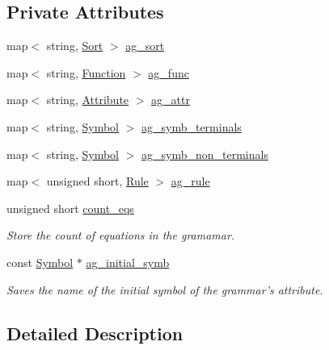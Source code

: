 \subsection*{Private Attributes}
\begin{DoxyCompactItemize}
\item 
map$<$ string, \hyperlink{classgenevalmag_1_1Sort}{Sort} $>$ \hyperlink{classgenevalmag_1_1Attr__grammar_a799dddeffb394e06770b8143b46cbc87}{ag\_\-sort}
\item 
map$<$ string, \hyperlink{classgenevalmag_1_1Function}{Function} $>$ \hyperlink{classgenevalmag_1_1Attr__grammar_a3ebc66b5f02a2c6806a6002dd09fc34f}{ag\_\-func}
\item 
map$<$ string, \hyperlink{classgenevalmag_1_1Attribute}{Attribute} $>$ \hyperlink{classgenevalmag_1_1Attr__grammar_af8eda41983da416b71568b230495cac3}{ag\_\-attr}
\item 
map$<$ string, \hyperlink{classgenevalmag_1_1Symbol}{Symbol} $>$ \hyperlink{classgenevalmag_1_1Attr__grammar_aae56008f83f809143d7f157a7281831d}{ag\_\-symb\_\-terminals}
\item 
map$<$ string, \hyperlink{classgenevalmag_1_1Symbol}{Symbol} $>$ \hyperlink{classgenevalmag_1_1Attr__grammar_a82631f05839109d0569a1554a35fa906}{ag\_\-symb\_\-non\_\-terminals}
\item 
map$<$ unsigned short, \hyperlink{classgenevalmag_1_1Rule}{Rule} $>$ \hyperlink{classgenevalmag_1_1Attr__grammar_a962f40d15bf80b0e10b27126bd149a93}{ag\_\-rule}
\item 
unsigned short \hyperlink{classgenevalmag_1_1Attr__grammar_a127f4869156cd76ee3381b19d8c7cc9a}{count\_\-eqs}
\begin{DoxyCompactList}\small\item\em Store the count of equations in the gramamar. \item\end{DoxyCompactList}\item 
const \hyperlink{classgenevalmag_1_1Symbol}{Symbol} $\ast$ \hyperlink{classgenevalmag_1_1Attr__grammar_abdcc6aa17756d47b0e6e131b26050b42}{ag\_\-initial\_\-symb}
\begin{DoxyCompactList}\small\item\em Saves the name of the initial symbol of the grammar's attribute. \item\end{DoxyCompactList}\end{DoxyCompactItemize}


\subsection{Detailed Description}


